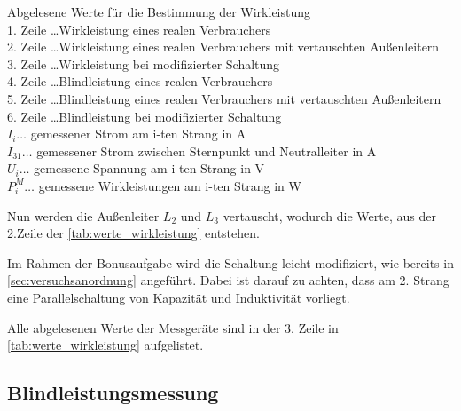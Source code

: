 \documentclass[12pt,english,ngerman]{scrartcl}
\begin{document}
\begin{table}[H]
	\caption[Abgelesene Werte für die Bestimmung der Wirkleistung] {Abgelesene Werte für die
		Bestimmung der Wirkleistung                                                \\
		1. Zeile \dots Wirkleistung eines realen Verbrauchers                      \\
		2. Zeile \dots Wirkleistung eines realen Verbrauchers mit vertauschten
		Außenleitern                                                               \\
		3. Zeile \dots Wirkleistung bei modifizierter Schaltung                    \\
		4. Zeile \dots Blindleistung eines realen Verbrauchers                     \\
		5. Zeile \dots Blindleistung eines realen Verbrauchers mit vertauschten
		Außenleitern                                                               \\
		6. Zeile \dots Blindleistung bei modifizierter Schaltung                   \\
		$I_i \dots$ gemessener Strom am i-ten Strang in A                          \\
		$I_{31} \dots$ gemessener Strom zwischen Sternpunkt und Neutralleiter in A \\
		$U_{i} \dots$ gemessene Spannung am i-ten Strang in V                      \\
		$P_{i}^M \dots$ gemessene Wirkleistungen am i-ten Strang in W
	}\label{tab:werte_wirkleistung}
	\centering
	
	\vskip -25.3pt
	
\end{table}

Nun werden die Außenleiter $L_2$ und $L_3$ vertauscht, wodurch die Werte, aus
der 2.Zeile der \autoref{tab:werte_wirkleistung} entstehen.

Im Rahmen der Bonusaufgabe wird die Schaltung leicht modifiziert, wie bereits
in \autoref{sec:versuchsanordnung} angeführt. Dabei ist darauf zu achten, dass
am 2. Strang eine Parallelschaltung von Kapazität und Induktivität vorliegt.

Alle abgelesenen Werte der Messgeräte sind in der 3. Zeile in
\autoref{tab:werte_wirkleistung} aufgelistet.

\subsection{Blindleistungsmessung}
\end{document}
